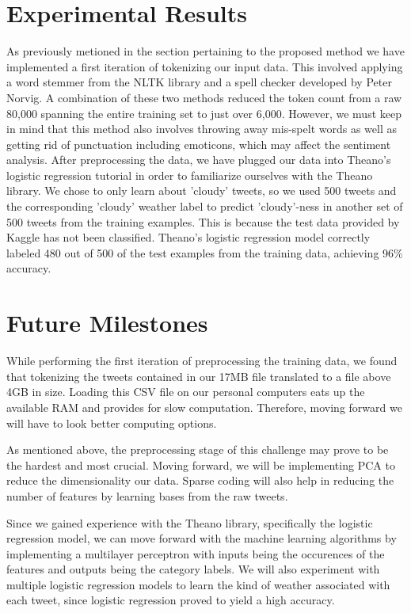 \documentclass{article}
\begin{document}
\section{Experimental Results}
As previously metioned in the section pertaining to the proposed method we have implemented a first iteration of tokenizing our input data. This involved applying a word stemmer from the NLTK library and a spell checker developed by Peter Norvig. A combination of these two methods reduced the token count from a raw 80,000 spanning the entire training set to just over 6,000. However, we must keep in mind that this method also involves throwing away mis-spelt words as well as getting rid of punctuation including emoticons, which may affect the sentiment analysis. After preprocessing the data, we have plugged our data into Theano's logistic regression tutorial in order to familiarize ourselves with the Theano library. We chose to only learn about 'cloudy' tweets, so we used 500 tweets and the corresponding 'cloudy' weather label to predict 'cloudy'-ness in another set of 500 tweets from the training examples. This is because the test data provided by Kaggle has not been classified. Theano's logistic regression model correctly labeled 480 out of 500 of the test examples from the training data, achieving 96\% accuracy.

\section{Future Milestones}
While performing the first iteration of preprocessing the training data, we found that tokenizing the tweets contained in our 17MB file translated to a file above 4GB in size. Loading this CSV file on our personal computers eats up the available RAM and provides for slow computation. Therefore, moving forward we will have to look better computing options.

As mentioned above, the preprocessing stage of this challenge may prove to be the hardest and most crucial. Moving forward, we will be implementing PCA to reduce the dimensionality our data. Sparse coding will also help in reducing the number of features by learning bases from the raw tweets.

Since we gained experience with the Theano library, specifically the logistic regression model, we can move forward with the machine learning algorithms by implementing a multilayer perceptron with inputs being the occurences of the features and outputs being the category labels. We will also experiment with multiple logistic regression models to learn the kind of weather associated with each tweet, since logistic regression proved to yield a high accuracy.
\end{document}
